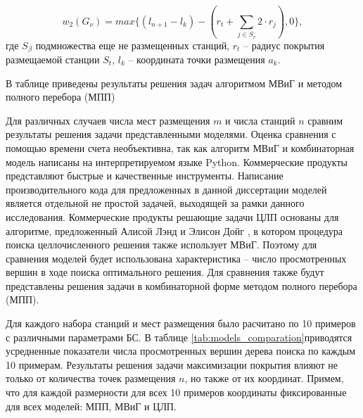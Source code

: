 \begin{equation}\label{eq2}
  w_2 \left(G_\nu \right) = max\{\left(l_{n+1}-l_k\right)-(r_t+\sum_{j\in S_v}{2 \cdot r_j}),0\},
\end{equation}
где $S_\beta$ подмножества еще не размещенных станций, $r_t$ -- радиус покрытия размещаемой станции $S_t$, $l_k$ -- координата точки размещения $a_k$.

В таблице приведены результаты решения задач алгоритмом МВиГ и методом полного перебора (МПП) 

Для различных случаев числа мест размещения $m$ и числа станций $n$ сравним результаты решения задачи представленными моделями. Оценка сравнения с помощью времени счета необъективна, так как алгоритм МВиГ и комбинаторная модель написаны на интерпретируемом языке Python. Коммерческие продукты представляют быстрые и качественные инструменты. Написание производительного кода для предложенных в данной диссертации моделей является отдельной не простой задачей, выходящей за рамки данного исследования. Коммерческие продукты решающие задачи ЦЛП основаны для алгоритме, предложенный Алисой Лэнд и Элисон Дойг \cite{Land1960}, в котором процедура поиска целлочисленного решения также использует МВиГ.  Поэтому для сравнения моделей будет использована характеристика -- число просмотренных вершин в ходе поиска оптимального решения. Для сравнения также будут представлены решения задачи в комбинаторной форме методом полного перебора (МПП).

Для каждого набора станций и мест размещения было расчитано по 10 примеров с различными параметрами БС. В таблице \cref{tab:models_comparation}приводятся усредненные показатели числа просмотренных вершин дерева поиска по каждым 10 примерам. Результаты решения задачи максимизации покрытия влияют не только от количества точек размещения $n$, но также от их координат. Примем, что для каждой размерности для всех 10 примеров координаты фиксированные для всех моделей: МПП, МВиГ и ЦЛП. 


